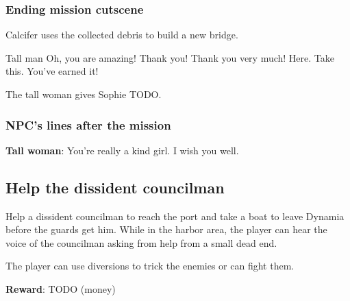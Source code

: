 \subsubsection*{Ending mission cutscene}
\begin{screenplay}

Calcifer uses the collected debris to build a new bridge.

\begin{dialogue}[excited]{Tall man}
Oh, you are amazing! Thank you! Thank you very much! Here. Take this. You've earned it!
\end{dialogue}

The tall woman gives Sophie TODO.

\end{screenplay}

\subsubsection*{NPC's lines after the mission}
\textbf{Tall woman}: You're really a kind girl. I wish you well.



\subsection{Help the dissident councilman}
Help a dissident councilman to reach the port and take a boat to leave Dynamia before the guards get him. While in the harbor area, the player can hear the voice of the councilman asking from help from a small dead end.

The player can use diversions to trick the enemies or can fight them.

\textbf{Reward}: TODO (money)

